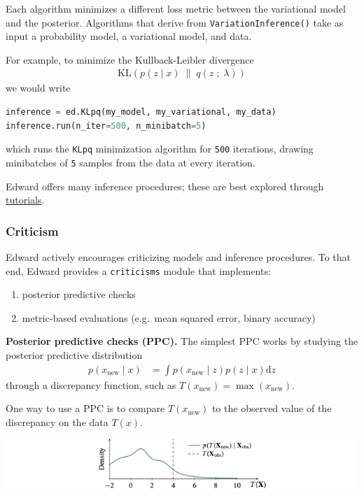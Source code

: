 Each algorithm minimizes a different loss metric between the variational model
and the posterior. Algorithms that derive from \texttt{VariationInference()}
take as input a probability model, a variational model, and data. 

For example, to minimize the Kullback-Leibler divergence
\begin{align*}
  \text{KL}(p(z \mid x) \;\|\; q(z \;;\; \lambda))
\end{align*}
we would write
\begin{lstlisting}[language=Python]
inference = ed.KLpq(my_model, my_variational, my_data)
inference.run(n_iter=500, n_minibatch=5)
\end{lstlisting}
which runs the \texttt{KLpq} minimization algorithm for \texttt{500} iterations,
drawing minibatches of \texttt{5} samples from the data at every iteration.

Edward offers many inference procedures; these are best explored through 
\href{tutorials.html}{tutorials}.

\subsubsection{Criticism}\label{criticism}

Edward actively encourages criticizing models and inference procedures. To that
end, Edward provides a \texttt{criticisms} module that implements:
\begin{enumerate}
  \item posterior predictive checks
  \item metric-based evaluations (e.g.~mean squared error, binary accuracy)
\end{enumerate}

\textbf{Posterior predictive checks (PPC).}
The simplest PPC works by studying the posterior predictive distribution
\begin{align*}
  p(x_\text{new} \mid x)
  &=
  \int
  p(x_\text{new} \mid z)
  p(z \mid x)
  \text{d} z
\end{align*}
through a discrepancy function, such as $T(x_\text{new}) = \max(x_\text{new})$.

One way to use a PPC is to compare $T(x_\text{new})$ to the observed value
of the discrepancy on the data $T(x)$. 

\includegraphics{images/ppc.png}

